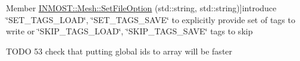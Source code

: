 \begin{DoxyRefList}
Member \hyperlink{classINMOST_1_1Mesh_a07c75e9dee2c400225a6095e45489ac1}{I\-N\-M\-O\-S\-T\-:\-:Mesh\-:\-:Set\-File\-Option} (std\-::string, std\-::string)]introduce \char`\"{}\-S\-E\-T\-\_\-\-T\-A\-G\-S\-\_\-\-L\-O\-A\-D\char`\"{}, \char`\"{}\-S\-E\-T\-\_\-\-T\-A\-G\-S\-\_\-\-S\-A\-V\-E\char`\"{} to explicitly provide set of tags to write or \char`\"{}\-S\-K\-I\-P\-\_\-\-T\-A\-G\-S\-\_\-\-L\-O\-A\-D\char`\"{}, \char`\"{}\-S\-K\-I\-P\-\_\-\-T\-A\-G\-S\-\_\-\-S\-A\-V\-E\char`\"{} tags to skip  
\item[\label{todo__todo000020}%
\hypertarget{todo__todo000020}{}%
Member \hyperlink{classINMOST_1_1Mesh_a9f8cfa72de874bd9a17fb0067ac8d515}{I\-N\-M\-O\-S\-T\-:\-:Mesh\-:\-:Sort\-By\-Global\-I\-D} (Handle\-Type $\ast$h, enumerator num)]T\-O\-D\-O 53 check that putting global ids to array will be faster 
\end{DoxyRefList}